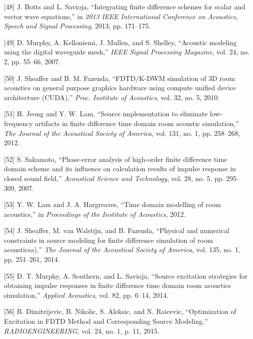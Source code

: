 \documentclass[]{scrreprt}
\begin{document}
\hypertarget{ref-bottsux5fintegratingux5f2013}{}
{[}48{]} J. Botts and L. Savioja, ``Integrating finite difference
schemes for scalar and vector wave equations,'' in \emph{2013 IEEE
International Conference on Acoustics, Speech and Signal Processing},
2013, pp. 171--175.

\hypertarget{ref-murphyux5facousticux5f2007}{}
{[}49{]} D. Murphy, A. Kelloniemi, J. Mullen, and S. Shelley, ``Acoustic
modeling using the digital waveguide mesh,'' \emph{IEEE Signal
Processing Magazine}, vol. 24, no. 2, pp. 55--66, 2007.

\hypertarget{ref-sheafferux5ffdtdux2fk-dwmux5f2010}{}
{[}50{]} J. Sheaffer and B. M. Fazenda, ``FDTD/K-DWM simulation of 3D
room acoustics on general purpose graphics hardware using compute
unified device architecture (CUDA),'' \emph{Proc. Institute of
Acoustics}, vol. 32, no. 5, 2010.

\hypertarget{ref-jeongux5fsourceux5f2012}{}
{[}51{]} H. Jeong and Y. W. Lam, ``Source implementation to eliminate
low-frequency artifacts in finite difference time domain room acoustic
simulation,'' \emph{The Journal of the Acoustical Society of America},
vol. 131, no. 1, pp. 258--268, 2012.

\hypertarget{ref-sakamotoux5fphase-errorux5f2007}{}
{[}52{]} S. Sakamoto, ``Phase-error analysis of high-order finite
difference time domain scheme and its influence on calculation results
of impulse response in closed sound field,'' \emph{Acoustical Science
and Technology}, vol. 28, no. 5, pp. 295--309, 2007.

\hypertarget{ref-lamux5ftimeux5f2012}{}
{[}53{]} Y. W. Lam and J. A. Hargreaves, ``Time domain modelling of room
acoustics,'' in \emph{Proceedings of the Institute of Acoustics}, 2012.

\hypertarget{ref-sheafferux5fphysicalux5f2014}{}
{[}54{]} J. Sheaffer, M. van Walstijn, and B. Fazenda, ``Physical and
numerical constraints in source modeling for finite difference
simulation of room acousticsa),'' \emph{The Journal of the Acoustical
Society of America}, vol. 135, no. 1, pp. 251--261, 2014.

\hypertarget{ref-murphyux5fsourceux5f2014}{}
{[}55{]} D. T. Murphy, A. Southern, and L. Savioja, ``Source excitation
strategies for obtaining impulse responses in finite difference time
domain room acoustics simulation,'' \emph{Applied Acoustics}, vol. 82,
pp. 6--14, 2014.

\hypertarget{ref-dimitrijevicux5foptimizationux5f2015}{}
{[}56{]} B. Dimitrijevic, B. Nikolic, S. Aleksic, and N. Raicevic,
``Optimization of Excitation in FDTD Method and Corresponding Source
Modeling,'' \emph{RADIOENGINEERING}, vol. 24, no. 1, p. 11, 2015.
\end{document}
